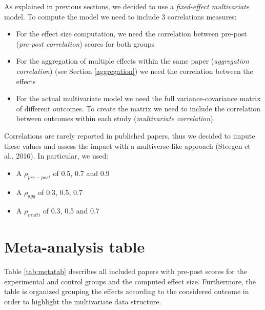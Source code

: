 \documentclass[
]{article}
\providecommand{\tightlist}{%
  \setlength{\itemsep}{0pt}\setlength{\parskip}{0pt}}
\begin{document}
As explained in previous sections, we decided to use a \emph{fixed-effect multivariate} model. To compute the model we need to include 3 correlations measures:

\begin{itemize}
\tightlist
\item
  For the effect size computation, we need the correlation between pre-post (\emph{pre-post correlation}) scores for both groups
\item
  For the aggregation of multiple effects within the same paper (\emph{aggregation correlation}) (see Section \ref{aggregation}) we need the correlation between the effects
\item
  For the actual multivariate model we need the full variance-covariance matrix of different outcomes. To create the matrix we need to include the correlation between outcomes within each study (\emph{multivariate correlation}).
\end{itemize}

Correlations are rarely reported in published papers, thus we decided to impute these values and assess the impact with a multiverse-like approach (Steegen et al., 2016). In particular, we used:

\begin{itemize}
\tightlist
\item
  A \(\rho_{pre-post}\) of 0.5, 0.7 and 0.9
\item
  A \(\rho_{agg}\) of 0.3, 0.5, 0.7
\item
  A \(\rho_{multi}\) of 0.3, 0.5 and 0.7
\end{itemize}

\hypertarget{meta-analysis-table}{%
\section{Meta-analysis table}\label{meta-analysis-table}}

Table \ref{tab:metatab} describes all included papers with pre-post scores for the experimental and control groups and the computed effect size. Furthermore, the table is organized grouping the effects according to the considered outcome in order to highlight the multivariate data structure.

\providecommand{\docline}[3]{\noalign{\global\setlength{\arrayrulewidth}{#1}}\arrayrulecolor[HTML]{#2}\cline{#3}}

\setlength{\tabcolsep}{0pt}

\renewcommand*{\arraystretch}{1.5}
\end{document}
